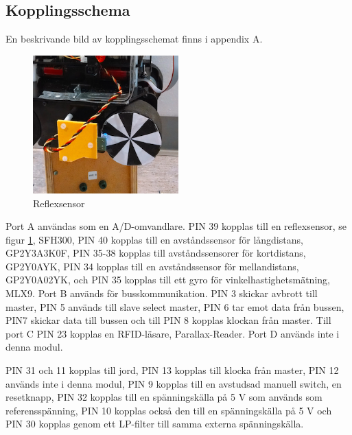 \documentclass[a4paper,12pt,fleqn]{article}
\begin{document}
\subsection{Kopplingsschema}

En beskrivande bild av kopplingsschemat finns i appendix A.

\begin{figure}[htp] %
  \begin{center}
  \includegraphics[keepaspectratio=true,width=0.5\textwidth]{../Kappa/reflexsensor.png}  %
  \end{center}
  \caption{Reflexsensor} %
  \label{fig:reflex} %
\end{figure}

Port A användas som en A/D-omvandlare. PIN 39 kopplas till en reflexsensor, se figur \ref{fig:reflex}, SFH300, PIN 40 kopplas till en avståndssensor för långdistans, GP\-2Y\-3A\-3K\-0F, PIN 35-38 kopplas till avståndssensorer för kortdistans, GP\-2Y\-0A\-YK, 
PIN 34 kopplas till en avståndssensor för mellandistans, GP2Y0A02YK, och PIN 35 kopplas till ett gyro för vinkelhastighetsmätning, ML\-X9. Port B används för busskommunikation. PIN 3 skickar avbrott till master, PIN 5 används till slave select master, PIN 6 tar emot data från bussen, PIN7 skickar data till bussen och till PIN 8 kopplas klockan från master. Till port C PIN 23 kopplas en RFID-läsare, Parallax-Reader. Port D används inte i denna modul. 

PIN 31 och 11 kopplas till jord, PIN 13 kopplas till klocka från master, PIN 12 används inte i denna modul, PIN 9 kopplas till en avstudsad manuell switch, en resetknapp, PIN 32 kopplas till en spänningskälla på 5 V som används som referensspänning, PIN 10 kopplas också den till en spänningskälla på 5 V och PIN 30 kopplas genom ett LP-filter till samma externa spänningskälla.
\end{document}
